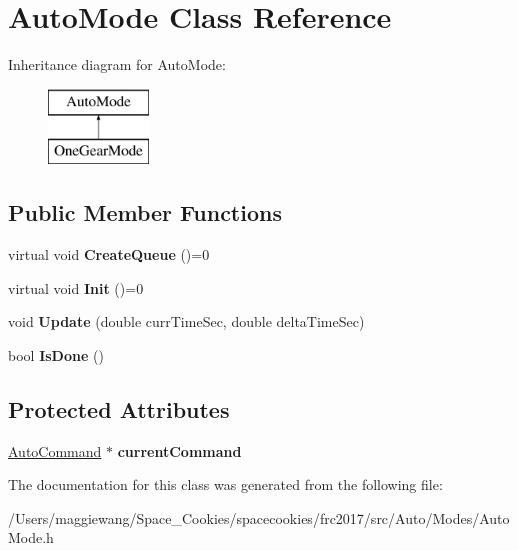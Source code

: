 \hypertarget{class_auto_mode}{}\section{Auto\+Mode Class Reference}
\label{class_auto_mode}
Inheritance diagram for Auto\+Mode\+:\begin{figure}[H]
\begin{center}
\leavevmode
\includegraphics[height=2.000000cm]{class_auto_mode}
\end{center}
\end{figure}
\subsection*{Public Member Functions}
\begin{DoxyCompactItemize}
\item 
\mbox{\label{class_auto_mode_a71d5383a52a2e1d29548099d86ae66b6}} 
virtual void {\bfseries Create\+Queue} ()=0
\item 
\mbox{\label{class_auto_mode_ae30ad1e90a36975db5b1bd6d0d764408}} 
virtual void {\bfseries Init} ()=0
\item 
\mbox{\label{class_auto_mode_af5eb2f835e2712588986ca8fd9a8735a}} 
void {\bfseries Update} (double curr\+Time\+Sec, double delta\+Time\+Sec)
\item 
\mbox{\label{class_auto_mode_a6f734a1af959e284fced7666e397bf65}} 
bool {\bfseries Is\+Done} ()
\end{DoxyCompactItemize}
\subsection*{Protected Attributes}
\begin{DoxyCompactItemize}
\item 
\mbox{\label{class_auto_mode_acaf4e4b36bbc309c6fae4cdac56b38d3}} 
\hyperlink{class_auto_command}{Auto\+Command} $\ast$ {\bfseries current\+Command}
\end{DoxyCompactItemize}


The documentation for this class was generated from the following file\+:\begin{DoxyCompactItemize}
\item 
/\+Users/maggiewang/\+Space\+\_\+\+Cookies/spacecookies/frc2017/src/\+Auto/\+Modes/Auto\+Mode.\+h\end{DoxyCompactItemize}
